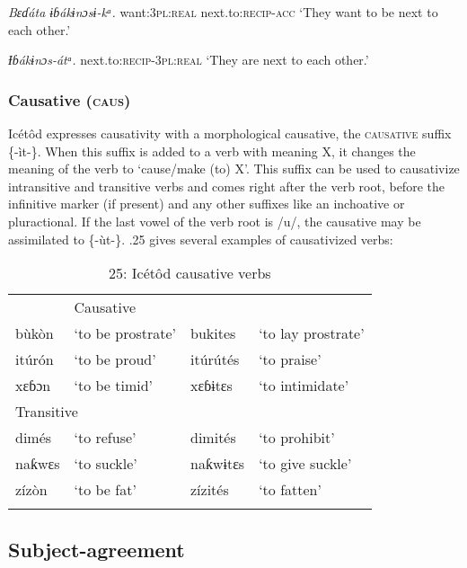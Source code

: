 \textit{Bɛɗáta     ɨɓák}\textit{ɨnɔsɨ}\textit{{}-kᵃ.}
want:\textsc{3pl:real}   next.to:\textsc{recip-acc}
‘They want to be next to each other.’




\textit{Ɨɓák}\textit{ɨnɔs}\textit{{}-átᵃ.}
next.to:\textsc{recip-3pl:real}
‘They are next to each other.’




\subsubsection{Causative (\textsc{caus})}

Icétôd expresses causativity with a morphological causative, the \textsc{causative} suffix \{-ìt-\}. When this suffix is added to a verb with meaning X, it changes the meaning of the verb to ‘cause/make (to) X’. This suffix can be used to causativize intransitive and transitive verbs and comes right after the verb root, before the infinitive marker (if present) and any other suffixes like an inchoative or pluractional. If the last vowel of the verb root is /u/, the causative may be assimilated to \{-ùt-\}. .25 gives several examples of causativized verbs:


\begin{table}
\caption{25: Icétôd causative verbs}
\label{tab:8}


\begin{tabularx}{\textwidth}{XXXX}
\lsptoprule

\multicolumn{2}{X}{Intransitive} & \multicolumn{2}{X}{Causative}\\
bùkòn & ‘to be prostrate’ & bukites & ‘to lay prostrate’\\
itúrón & ‘to be proud’ & itúrútés & ‘to praise’\\
xɛɓɔn & ‘to be timid’ & xɛɓɨtɛs & ‘to intimidate’\\
\multicolumn{2}{X}{Transitive} &  & \\
dimés & ‘to refuse’ & dimités & ‘to prohibit’\\
naƙwɛs & ‘to suckle’ & naƙwɨtɛs & ‘to give suckle’\\
zízòn & ‘to be fat’ & zízités & ‘to fatten’\\
\lspbottomrule
\end{tabularx}
\end{table}



\subsection{Subject-agreement}


